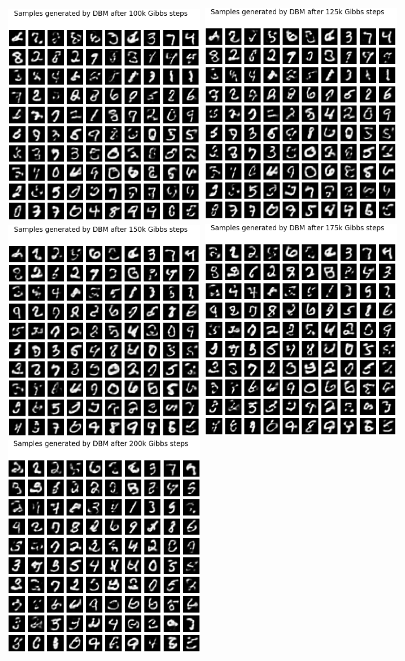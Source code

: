 \begin{figure}[h]
\begin{mdframed}
\quad
\includegraphics[width=2in]{dbm-mnist/samples_100k.png}
\quad
\includegraphics[width=2in]{dbm-mnist/samples_125k.png}
\\[2em]
\includegraphics[width=2in]{dbm-mnist/samples_150k.png}
\quad
\includegraphics[width=2in]{dbm-mnist/samples_175k.png}
\quad
\includegraphics[width=2in]{dbm-mnist/samples_200k.png}

\end{mdframed}
\end{figure}
